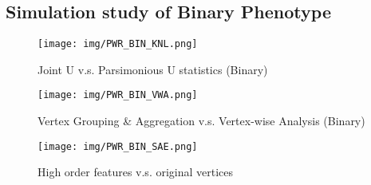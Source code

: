 \subsection{Simulation study of Binary Phenotype}
%
\begin{figure}[!htbp]
\begin{center}
\caption{Joint U v.s. Parsimonious U statistics (Binary)}
\label{fig:PWR_BIN_KNL}
\texttt{[image: img/PWR\_BIN\_KNL.png]}
\end{center}
\end{figure}
%
\begin{figure}[!htbp]
\begin{center}\centering
\caption{Vertex Grouping \& Aggregation v.s. Vertex-wise Analysis (Binary)}
\label{fig:PWR_BIN_VWA}
\texttt{[image: img/PWR\_BIN\_VWA.png]}
\end{center}
\end{figure}
%
\begin{figure}[!htbp]
\begin{center}
\caption{High order features v.s. original vertices}
\label{fig:PWR_BIN_SAE}
\texttt{[image: img/PWR\_BIN\_SAE.png]}
\end{center}
\end{figure}